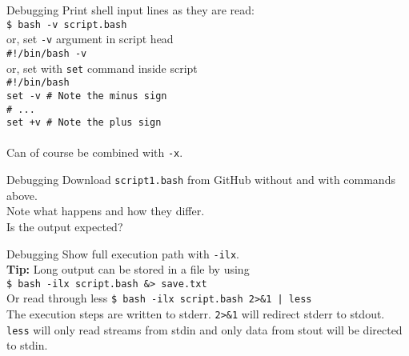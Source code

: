 \documentclass{beamer}
\let\tt\texttt
\let\bf\textbf
\begin{document}
\begin{frame}{Debugging}
    Print shell input lines as they are read:   \\
    \tt{\$ bash -v script.bash}     \\
    or, set \tt{-v} argument in script head \\
    \tt{\#!/bin/bash -v}            \\
    or, set with \tt{set} command inside script \\
    \tt{\#!/bin/bash}               \\
    \tt{set -v  \# Note the minus sign}  \\
    \tt{\# ...}                          \\
    \tt{set +v  \# Note the plus sign}   \\
    \quad                           \\
    Can of course be combined with \tt{-x}.
\end{frame}

\begin{frame}{Debugging}
    Download \tt{script1.bash} from GitHub without and with commands above. \\
    Note what happens and how they differ.      \\
    Is the output expected?                     \\
\end{frame}

\begin{frame}{Debugging}
    Show full execution path with \tt{-ilx}.    \\
    \bf{Tip:} Long output can be stored in a file by using  \\
    \quad \tt{\$ bash -ilx script.bash \&> save.txt}         \\
    Or read through less
    \quad \tt{\$ bash -ilx script.bash 2>\&1 | less}         \\
    The execution steps are written to stderr. \tt{2>\&1} will redirect stderr to stdout. \tt{less} will only read streams from stdin and only data from stout will be directed to stdin.
\end{frame}
\end{document}
